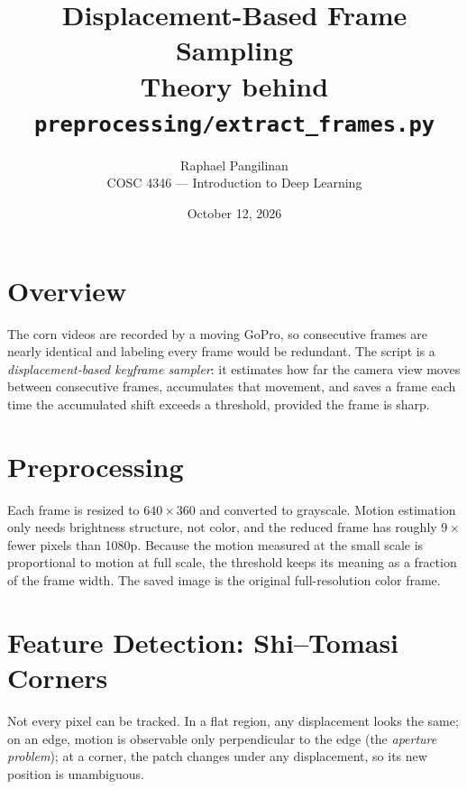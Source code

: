 \documentclass[11pt]{article}
\title{Displacement-Based Frame Sampling\\\large Theory behind \texttt{preprocessing/extract\_frames.py}}
\author{Raphael Pangilinan\\COSC 4346 --- Introduction to Deep Learning}
\date{October 12, 2026}
\begin{document}
\maketitle

\section{Overview}
The corn videos are recorded by a moving GoPro, so consecutive frames are
nearly identical and labeling every frame would be redundant. The script is a
\emph{displacement-based keyframe sampler}: it estimates how far the camera
view moves between consecutive frames, accumulates that movement, and saves a
frame each time the accumulated shift exceeds a threshold, provided the frame
is sharp.

\begin{center}
\end{center}

\section{Preprocessing}
Each frame is resized to $640\times360$ and converted to grayscale. Motion
estimation only needs brightness structure, not color, and the reduced frame
has roughly $9\times$ fewer pixels than 1080p. Because the motion measured at
the small scale is proportional to motion at full scale, the threshold keeps
its meaning as a fraction of the frame width. The saved image is the original
full-resolution color frame.

\section{Feature Detection: Shi--Tomasi Corners}
Not every pixel can be tracked. In a flat region, any displacement looks the
same; on an edge, motion is observable only perpendicular to the edge (the
\emph{aperture problem}); at a corner, the patch changes under any
displacement, so its new position is unambiguous.
\end{document}

